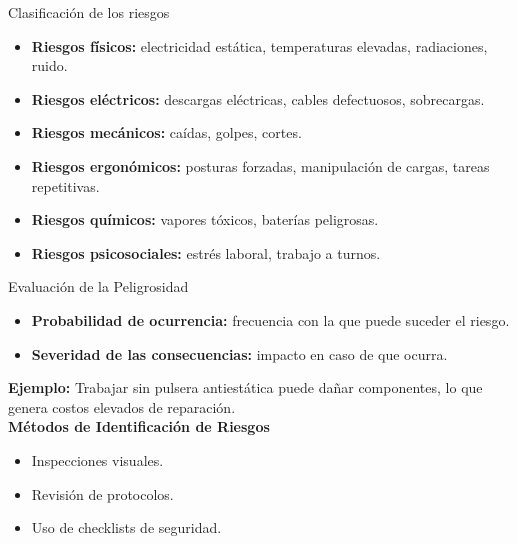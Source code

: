 \documentclass{beamer}
\begin{document}
\begin{frame}{Clasificación de los riesgos}
    \begin{itemize}
        \item \textbf{Riesgos físicos:} electricidad estática, temperaturas elevadas, radiaciones, ruido.
        \item \textbf{Riesgos eléctricos:} descargas eléctricas, cables defectuosos, sobrecargas.
        \item \textbf{Riesgos mecánicos:} caídas, golpes, cortes.
        \item \textbf{Riesgos ergonómicos:} posturas forzadas, manipulación de cargas, tareas repetitivas.
        \item \textbf{Riesgos químicos:} vapores tóxicos, baterías peligrosas.
        \item \textbf{Riesgos psicosociales:} estrés laboral, trabajo a turnos.
    \end{itemize}
\end{frame}

\begin{frame}{Evaluación de la Peligrosidad}
    \begin{itemize}
        \item \textbf{Probabilidad de ocurrencia:} frecuencia con la que puede suceder el riesgo.
        \item \textbf{Severidad de las consecuencias:} impacto en caso de que ocurra.
    \end{itemize}
    \vspace{0.5cm}
    \textbf{Ejemplo:} Trabajar sin pulsera antiestática puede dañar componentes, lo que genera costos elevados de reparación.\\\vspace{1cm}
    \textbf{Métodos de Identificación de Riesgos}
    \begin{itemize}
        \item Inspecciones visuales.
        \item Revisión de protocolos.
        \item Uso de checklists de seguridad.
    \end{itemize}
\end{frame}
\end{document}
